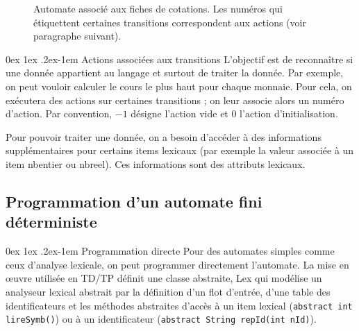 \documentclass[a4paper]{article}
\makeatletter
\renewcommand{\paragraph}{%
  \@startsection{paragraph}{4}%
  {\z@}{0ex \@plus 1ex \@minus .2ex}{-1em}%
  {\normalfont\normalsize\bfseries}%
}
\makeatother
\begin{document}
\begin{figure}[h]
\caption{Automate associé aux fiches de cotations. Les numéros qui étiquettent certaines transitions correspondent aux actions (voir paragraphe suivant).}\end{figure}

\paragraph{Actions associées aux transitions} L'objectif est de reconnaître si une donnée appartient au langage et surtout de traiter la donnée. Par exemple, on peut vouloir calculer le cours le plus haut pour chaque monnaie. Pour cela, on exécutera des actions sur certaines transitions ; on leur associe alors un numéro d'action. Par convention, $-1$ désigne l'action vide et 0 l'action d'initialisation.

Pour pouvoir traiter une donnée, on a besoin d'accéder à des informations supplémentaires pour certains items lexicaux (par exemple la valeur associée à un item nbentier ou nbreel). Ces informations sont des attributs lexicaux.

\subsection{Programmation d'un automate fini déterministe}

\paragraph{Programmation directe} Pour des automates simples comme ceux d'analyse lexicale, on peut programmer directement l'automate. La mise en \oe uvre utilisée en TD/TP définit une classe abstraite, Lex qui modélise un analyseur lexical abstrait par la définition d'un flot d'entrée, d'une table des identificateurs et les méthodes abstraites d'accès à un item lexical (\verb?abstract int lireSymb()?) ou à un identificateur (\verb?abstract String repId(int nId)?).
\end{document}
